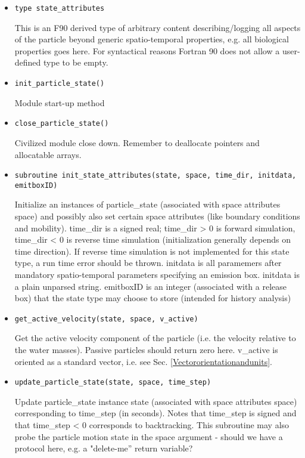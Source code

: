 \begin{itemize}

\item {\tt  type state\_attributes }

This is an F90 derived type of arbitrary content
describing/logging all aspects of the particle beyond
generic spatio-temporal properties, e.g. all biological
properties goes here. For syntactical reasons Fortran 90 does not allow 
a user-defined type to be empty.

\item {\tt  init\_particle\_state() }  

Module start-up method

\item {\tt  close\_particle\_state()}  

Civilized module close down. Remember to deallocate 
pointers and allocatable arrays.

\item {\tt  subroutine init\_state\_attributes(state, space, time\_dir,             
      initdata, emitboxID)} 

Initialize an instances of particle\_state 
(associated with space attributes space) and possibly also set 
certain space attributes
(like boundary conditions and mobility). time\_dir is a signed real;
time\_dir > 0 is forward simulation, time\_dir < 0 is reverse time
simulation (initialization generally depends on time direction).
If reverse time simulation is not implemented for this state type,
a run time error should be thrown.
initdata is all paramemers after mandatory spatio-temporal parameters
specifying an emission box. initdata is a plain unparsed string.
emitboxID is an integer (associated with a release box) that the
state type may choose to store (intended for history analysis)



\item {\tt  get\_active\_velocity(state, space, v\_active)} 

Get the active velocity component of the particle (i.e. the velocity relative
to the water masses). Passive particles should return zero here.
v\_active is oriented as a standard vector, i.e. 
see Sec. \ref{Vectororientationandunits}.

\item {\tt  update\_particle\_state(state, space, time\_step)} 

Update particle\_state instance state (associated with space attributes
space) corresponding to time\_step (in seconds). Notes that
time\_step is signed and that time\_step < 0 corresponds to backtracking.
This subroutine may also probe the particle motion state in the 
space argument - should we have a protocol here, e.g. a "delete-me''
return variable?


\end{itemize}
